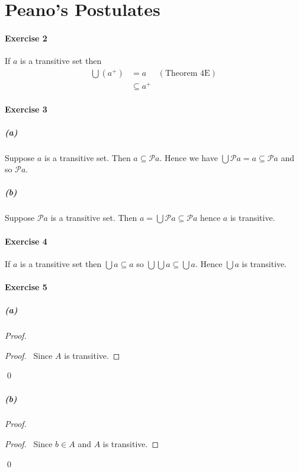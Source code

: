 \documentclass{report}
\begin{document}
    \section{Peano's Postulates}

    \paragraph{Exercise 2}
    If $a$ is a transitive set then
    \begin{align*}
        \bigcup (a^+) & = a & (\text{Theorem 4E}) \\
        & \subseteq a^+
    \end{align*}

    \paragraph{Exercise 3}
    \subparagraph{(a)}
    Suppose $a$ is a transitive set. Then $a \subseteq \mathcal{P} a$. Hence we have
    $\bigcup \mathcal{P} a = a \subseteq \mathcal{P} a$ and so $\mathcal{P} a$.
    
    \subparagraph{(b)}
    Suppose $\mathcal{P} a$ is a transitive set. Then $a = \bigcup \mathcal{P} a \subseteq \mathcal{P} a$
    hence $a$ is transitive.

    \paragraph{Exercise 4}
    If $a$ is a transitive set then $\bigcup a \subseteq a$ so $\bigcup \bigcup a \subseteq \bigcup a$.
    Hence $\bigcup a$ is transitive.

    \paragraph{Exercise 5}
    \subparagraph{(a)}
    \begin{proof}
        \pf
        \begin{proof}
            \pf\ Since $A$ is transitive.
        \end{proof}
        \qed
    \end{proof}

    \subparagraph{(b)}
    \begin{proof}
        \pf
        \begin{proof}
            \pf\ Since $b \in A$ and $A$ is transitive.
        \end{proof}
        \qed
    \end{proof}
\end{document}
